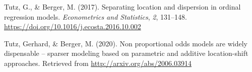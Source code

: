 \documentclass[
  man,floatsintext]{apa6}
\newlength{\cslhangindent}
\newenvironment{CSLReferences}[2] %
 {\begin{list}{}{%
  \setlength{\itemindent}{0pt}
  \setlength{\leftmargin}{0pt}
  \setlength{\parsep}{0pt}
  \ifodd #1
   \setlength{\leftmargin}{\cslhangindent}
   \setlength{\itemindent}{-1\cslhangindent}
  \fi
  \setlength{\itemsep}{#2\baselineskip}}}
 {\end{list}}
\begin{document}
\begin{CSLReferences}{1}{0}
Tutz, G., \& Berger, M. (2017). Separating location and dispersion in ordinal regression models. \emph{Econometrics and Statistics}, \emph{2}, 131--148. \url{https://doi.org/10.1016/j.ecosta.2016.10.002}

Tutz, Gerhard, \& Berger, M. (2020). Non proportional odds models are widely dispensable -- sparser modeling based on parametric and additive location-shift approaches. Retrieved from \url{http://arxiv.org/abs/2006.03914}

\end{CSLReferences}
\end{document}
